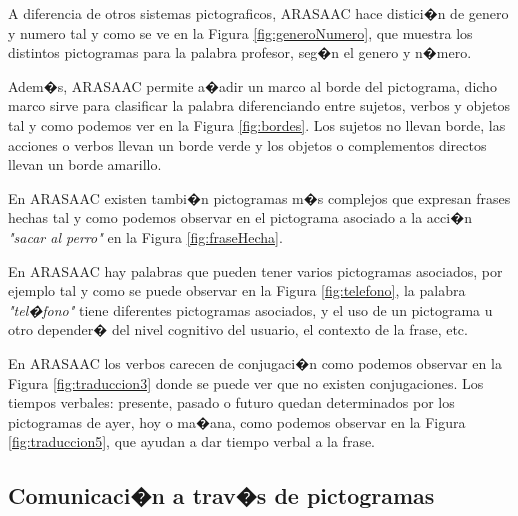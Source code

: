 A diferencia de otros sistemas pictograficos, ARASAAC hace distici�n de genero y numero tal y como se ve en la Figura \ref{fig:generoNumero}, que muestra los distintos pictogramas para la palabra profesor, seg�n el genero y n�mero. 


Adem�s, ARASAAC permite a�adir un marco al borde del pictograma, dicho marco sirve para clasificar la palabra diferenciando entre sujetos, verbos y objetos tal y como podemos ver en la Figura \ref{fig:bordes}. Los sujetos no llevan borde, las acciones o verbos llevan un borde verde y los objetos o complementos directos llevan un borde amarillo.


En ARASAAC existen tambi�n pictogramas m�s complejos que expresan frases hechas tal y como podemos observar en el pictograma asociado a la acci�n \textit{"sacar al perro"} en la Figura \ref{fig:fraseHecha}.


En ARASAAC hay palabras que pueden tener varios pictogramas asociados, por ejemplo tal y como se puede observar en la Figura \ref{fig:telefono}, la palabra \textit{"tel�fono"} tiene diferentes pictogramas asociados, y el uso de un pictograma u otro depender� del nivel cognitivo del usuario, el contexto de la frase, etc.

En ARASAAC los verbos carecen de conjugaci�n como podemos observar en la Figura \ref{fig:traduccion3} donde se puede ver que no existen conjugaciones. Los tiempos verbales: presente, pasado o futuro quedan determinados por los pictogramas de ayer, hoy o ma�ana, como podemos observar en la Figura \ref{fig:traduccion5}, que ayudan a dar tiempo verbal a la frase. 
 
\subsection{Comunicaci�n a trav�s de pictogramas}

